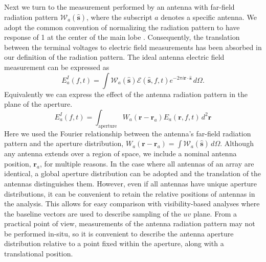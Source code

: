 \documentclass[a4paper,fleqn,usenatbib]{mnras}
\begin{document}
Next we turn to the measurement performed by an antenna with far-field radiation pattern 
$\mathcal{W}_a(\hat{\mathbf{s}})$, where the subscript $a$ denotes a specific antenna. We 
adopt the common convention of normalizing the radiation pattern to have response of 1 at the 
center of the main lobe \citep[e.g.][]{nap99}. Consequently, the translation between the terminal 
voltages to electric field measurements has been absorbed in our definition of the radiation 
pattern. The ideal antenna electric field measurement can be expressed as 
\begin{equation}
E^I_a(f,t) = \int \mathcal{W}_a(\hat{\mathbf{s}})\mathcal{E}(\hat{\mathbf{s}},f,t) e^{-2\pi i \mathbf{r} \cdot \hat{\mathbf{s}}}\, d\Omega. 
\end{equation}
Equivalently we can express the effect of the antenna radiation pattern in the plane of the 
aperture.
\begin{equation}
E^I_a(f,t) = \int_{\mathrm{aperture}}W_a(\mathbf{r}-\mathbf{r}_a)E_a(\mathbf{r},f,t)\,d^2\mathbf{r}
\end{equation}
Here we used the Fourier relationship between the antenna's far-field radiation pattern and the 
aperture distribution, $W_a(\mathbf{r}-\mathbf{r}_a)=\int  \mathcal{W}_a(\hat{\mathbf{s}}) \, d
\Omega$. Although any antenna extends over a region of space, we include a nominal antenna 
position, $\mathbf{r}_a$, for multiple reasons. In the case where all antennas of an array are 
identical, a global aperture distribution can be adopted and the translation of the antennas 
distinguishes them. However, even if all antennas have unique aperture distributions, it can be 
convenient to retain the relative positions of antennas in the analysis. This allows for easy 
comparison with visibility-based analyses where the baseline vectors are used to describe 
sampling of the $uv$ plane. From a practical point of view, measurements of the antenna 
radiation pattern may not be performed in-situ, so it is convenient to describe the antenna 
aperture distribution relative to a point fixed within the aperture, along with a translational 
position.
\end{document}
